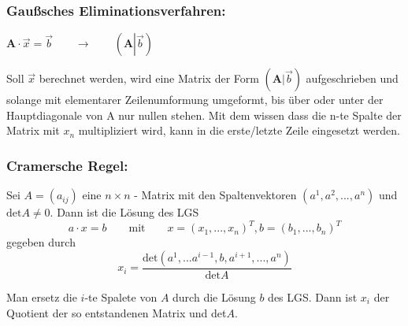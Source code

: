 \subsubsection{Gaußsches Eliminationsverfahren:}

$\mathbf{A}\cdot \vec{x} =\vec{b}\qquad\rightarrow \qquad \left (\mathbf{A} \left | \vec{b}\right ) \right .$

Soll $\vec{x}$ berechnet werden, wird eine Matrix der Form $(\mathbf{A}|\vec{b})$ aufgeschrieben und solange mit elementarer Zeilenumformung umgeformt, bis über oder unter der Hauptdiagonale von A nur nullen stehen. Mit dem wissen dass die n-te Spalte der Matrix mit $x_n$ multipliziert wird, kann in die erste/letzte Zeile eingesetzt werden.


\subsubsection{Cramersche Regel:}
Sei $A=(a_{ij})$ eine $n\times n$ - Matrix mit den Spaltenvektoren $(a^1,a^2,...,a^n)$ und $\text{det}A\neq 0$. Dann ist die Lösung des LGS
\[a\cdot x = b \qquad \text{mit} \qquad x = (x_1, ... , x_n)^T, b=(b_1,...,b_n)^T\]
gegeben durch
\[x_i=\frac{\text{det}(a^1,...a^{i-1}, b, a^{i+1},...,a^n)}{\text{det}A}\]

Man ersetz die $i$-te Spalete von $A$ durch die Lösung $b$ des LGS. Dann ist $x_i$ der Quotient der so entstandenen Matrix und det$A$.
